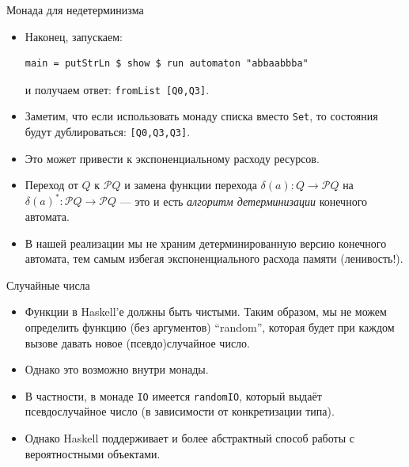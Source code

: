 \documentclass[xcolor=dvipsnames]{beamer}
\newcommand{\Pc}{\mathcal{P}}
\begin{document}
\begin{frame}[fragile]{Монада для недетерминизма}
 \begin{itemize}[<+->]
  \item Наконец, запускаем:
\begin{verbatim}
main = putStrLn $ show $ run automaton "abbaabbba"
\end{verbatim}
и получаем ответ: {\tt fromList [Q0,Q3]}.
\item Заметим, что если использовать монаду списка вместо \texttt{Set}, то состояния будут дублироваться: {\tt [Q0,Q3,Q3]}.
\item Это может привести к экспоненциальному расходу ресурсов.
\item Переход от $Q$ к $\Pc Q$ и замена функции перехода $\delta(a) \colon Q \to \Pc Q$ на $\delta(a)^* \colon \Pc Q \to \Pc Q$ --- это и есть {\em алгоритм детерминизации} конечного автомата.
\item В нашей реализации мы не храним детерминированную версию конечного автомата, тем самым избегая экспоненциального расхода памяти (ленивость!).
 \end{itemize}

 
\end{frame}



\begin{frame}{Случайные числа}

\begin{itemize}[<+->]
 \item Функции в Haskell'е должны быть чистыми. Таким образом, мы не можем определить функцию (без аргументов) ``random'', которая будет при каждом вызове давать новое (псевдо)случайное число.
 \item Однако это возможно внутри монады. 
 \item В частности, в монаде \texttt{IO} имеется {\tt randomIO}, который выдаёт псевдослучайное число (в зависимости от конкретизации типа).
 \item Однако Haskell поддерживает и более абстрактный способ работы с вероятностными объектами.
\end{itemize}


\end{frame}
\end{document}
